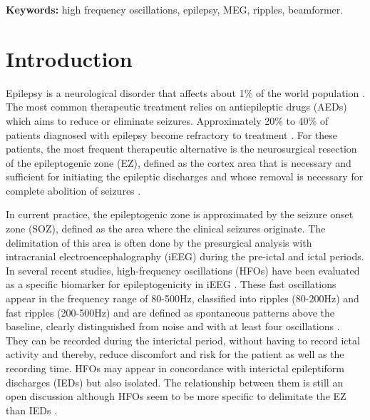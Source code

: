 \textbf{Keywords:} high frequency oscillations, epilepsy, MEG, ripples, beamformer.

\section{Introduction}

Epilepsy is a neurological disorder that affects about 1\% of the world population \citep{Ramey2013}. The most common therapeutic treatment relies on antiepileptic drugs (AEDs) which aims to reduce or eliminate seizures. Approximately 20\% to 40\% of patients diagnosed with epilepsy become refractory to treatment \citep{Liu2015c}. For these patients, the most frequent therapeutic alternative is the neurosurgical resection of the epileptogenic zone (EZ), defined as the cortex area that is necessary and sufficient for initiating the epileptic discharges and whose removal is necessary for complete abolition of seizures \citep{Schuele2008}.

In current practice, the epileptogenic zone is approximated by the seizure onset zone (SOZ), defined as the area where the clinical seizures originate. The delimitation of this area is often done by the presurgical analysis with intracranial electroencephalography (iEEG) \citep{Rosenow2001} during the pre-ictal and ictal periods. In several recent studies, high-frequency oscillations (HFOs) have been evaluated as a specific biomarker for epileptogenicity in iEEG \citep{Jacobs2012,Fujiwara2012,Sun2015}. These fast oscillations appear in the frequency range of 80-500Hz, classified into ripples (80-200Hz) and fast ripples (200-500Hz) and are defined as spontaneous patterns above the baseline, clearly distinguished from noise and with at least four oscillations \citep{Worrel2012}. They can be recorded during the interictal period, without having to record ictal activity and thereby, reduce discomfort and risk for the patient as well as the recording time. HFOs may appear in concordance with interictal epileptiform discharges (IEDs) but also isolated. The relationship between them is still an open discussion although HFOs seem to be more specific to delimitate the EZ than IEDs \citep{Jacobs2012}.

